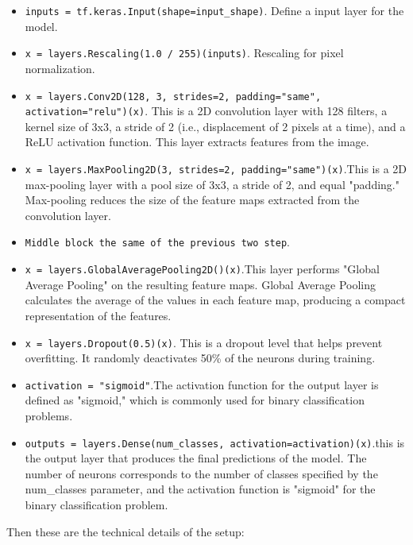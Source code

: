 \begin{itemize}
\item \texttt{inputs = tf.keras.Input(shape=input\_shape)}. Define a input layer for the model. 
\item \texttt{x = layers.Rescaling(1.0 / 255)(inputs)}. Rescaling for pixel normalization.
\item \texttt{x = layers.Conv2D(128, 3, strides=2, padding="same", activation="relu")(x)}. This is a 2D convolution layer with 128 filters, a kernel size of 3x3, a stride of 2 (i.e., displacement of 2 pixels at a time), and a ReLU activation function. This layer extracts features from the image.
\item \texttt{x = layers.MaxPooling2D(3, strides=2, padding="same")(x)}.This is a 2D max-pooling layer with a pool size of 3x3, a stride of 2, and equal "padding." Max-pooling reduces the size of the feature maps extracted from the convolution layer.
\item \texttt{Middle block the same of the previous two step}.
\item \texttt{x = layers.GlobalAveragePooling2D()(x)}.This layer performs "Global Average Pooling" on the resulting feature maps. Global Average Pooling calculates the average of the values in each feature map, producing a compact representation of the features.
\item \texttt{x = layers.Dropout(0.5)(x)}. This is a dropout level that helps prevent overfitting. It randomly deactivates 50\% of the neurons during training.
\item \texttt{activation = "sigmoid"}.The activation function for the output layer is defined as "sigmoid," which is commonly used for binary classification problems.
\item \texttt{outputs = layers.Dense(num\_classes, activation=activation)(x)}.this is the output layer that produces the final predictions of the model. The number of neurons corresponds to the number of classes specified by the num\_classes parameter, and the activation function is "sigmoid" for the binary classification problem.
\end{itemize}
Then these are the technical details of the setup:
